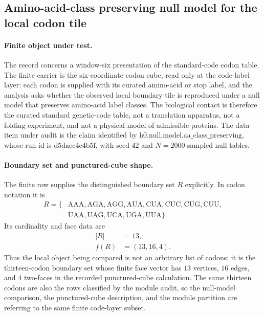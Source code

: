 \subsection{Amino-acid-class preserving null model for the local codon tile}
\label{sec:bioreality-h0-null-model-aa-class-preserving}

\paragraph{Finite object under test.}
The record concerns a window-six presentation of the standard-code codon table.  The finite carrier is the six-coordinate codon cube, read only at the code-label layer: each codon is supplied with its curated amino-acid or stop label, and the analysis asks whether the observed local boundary tile is reproduced under a null model that preserves amino-acid label classes.  The biological contact is therefore the curated standard genetic-code table, not a translation apparatus, not a folding experiment, and not a physical model of admissible proteins.  The data item under audit is the claim identified by $\mathrm{h0.null.model.aa\_class\_preserving}$, whose run id is $\mathrm{d5daec4c4b5f}$, with seed $42$ and $N=2000$ sampled null tables.

\paragraph{Boundary set and punctured-cube shape.}
The finite row supplies the distinguished boundary set $R$ explicitly.  In codon notation it is
$$
\begin{aligned}
R=\{&\mathrm{AAA},\mathrm{AGA},\mathrm{AGG},\mathrm{AUA},\mathrm{CUA},\mathrm{CUC},\mathrm{CUG},\mathrm{CUU},\\
&\mathrm{UAA},\mathrm{UAG},\mathrm{UCA},\mathrm{UGA},\mathrm{UUA}\}.
\end{aligned}
$$
Its cardinality and face data are
$$
\begin{aligned}
|R|&=13,\\
f(R)&=(13,16,4).
\end{aligned}
$$
Thus the local object being compared is not an arbitrary list of codons: it is the thirteen-codon boundary set whose finite face vector has $13$ vertices, $16$ edges, and $4$ two-faces in the recorded punctured-cube calculation.  The same thirteen codons are also the rows classified by the module audit, so the null-model comparison, the punctured-cube description, and the module partition are referring to the same finite code-layer subset.

